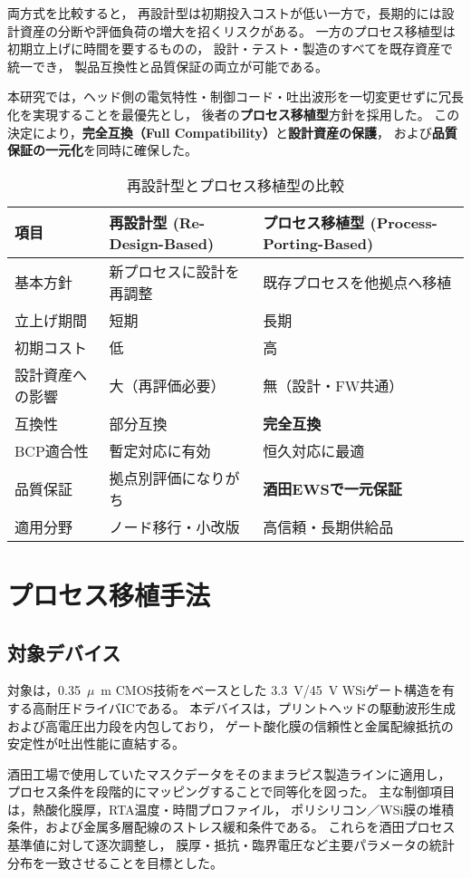 \documentclass[conference]{IEEEtran}
\newcommand{\micro}{\ensuremath{\mu}}
\begin{document}
両方式を比較すると，
再設計型は初期投入コストが低い一方で，長期的には設計資産の分断や評価負荷の増大を招くリスクがある。
一方のプロセス移植型は初期立上げに時間を要するものの，
設計・テスト・製造のすべてを既存資産で統一でき，
製品互換性と品質保証の両立が可能である。

本研究では，ヘッド側の電気特性・制御コード・吐出波形を一切変更せずに冗長化を実現することを最優先とし，
後者の\textbf{プロセス移植型}方針を採用した。
この決定により，\textbf{完全互換（Full Compatibility）}と\textbf{設計資産の保護}，
および\textbf{品質保証の一元化}を同時に確保した。

\begin{table}[t]
\centering
\caption{再設計型とプロセス移植型の比較}
\label{tab:approach_compare}
\begin{tabular}{p{25mm}p{31mm}p{31mm}}
\toprule
項目 & 再設計型 (Re-Design-Based) & プロセス移植型 (Process-Porting-Based) \\
\midrule
基本方針 & 新プロセスに設計を再調整 & 既存プロセスを他拠点へ移植 \\
立上げ期間 & 短期 & 長期 \\
初期コスト & 低 & 高 \\
設計資産への影響 & 大（再評価必要） & 無（設計・FW共通） \\
互換性 & 部分互換 & \textbf{完全互換} \\
BCP適合性 & 暫定対応に有効 & 恒久対応に最適 \\
品質保証 & 拠点別評価になりがち & \textbf{酒田EWSで一元保証} \\
適用分野 & ノード移行・小改版 & 高信頼・長期供給品 \\
\bottomrule
\end{tabular}
\end{table}

\section{プロセス移植手法}

\subsection{対象デバイス}
対象は，\SI{0.35}{\micro\meter} CMOS技術をベースとした
\SI{3.3}{\volt}/\SI{45}{\volt} WSiゲート構造を有する高耐圧ドライバICである。
本デバイスは，プリントヘッドの駆動波形生成および高電圧出力段を内包しており，
ゲート酸化膜の信頼性と金属配線抵抗の安定性が吐出性能に直結する。

酒田工場で使用していたマスクデータをそのままラピス製造ラインに適用し，
プロセス条件を段階的にマッピングすることで同等化を図った。
主な制御項目は，熱酸化膜厚，RTA温度・時間プロファイル，
ポリシリコン／WSi膜の堆積条件，および金属多層配線のストレス緩和条件である。
これらを酒田プロセス基準値に対して逐次調整し，
膜厚・抵抗・臨界電圧など主要パラメータの統計分布を一致させることを目標とした。
\end{document}
